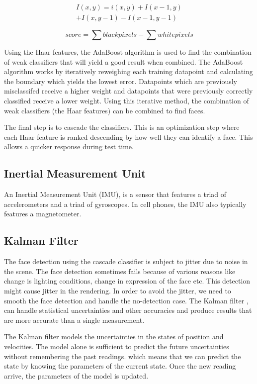 \documentclass[12pt,twocolumn,letterpaper]{article}
\begin{document}
\begin{multline}
\label{eqn:integral}
I(x,y) =  i(x,y) + I(x-1,y) 
\\+ I(x, y-1) - I(x-1, y-1)
\end{multline}


\textbf{\begin{equation}
\label{eqn:haar}
score = \sum{black pixels} - \sum{white pixels}
\end{equation}}

Using the Haar features, the AdaBoost algorithm is used to find the combination of weak classifiers that will yield a good result when combined.  The AdaBoost algorithm works by iteratively reweighing each training datapoint and calculating the boundary which yields the lowest error.  Datapoints which are previously misclassifed receive a higher weight and datapoints that were previously correctly classified receive a lower weight.  Using this iterative method, the combination of weak classifiers (the Haar features) can be combined to find faces.

The final step is to cascade the classifiers.  This is an optimization step where each Haar feature is ranked descending by how well they can identify a face.  This allows a quicker response during test time.
    
\subsection{Inertial Measurement Unit}
An Inertial Measurement Unit (IMU), is a sensor that features a triad of accelerometers and a triad of gyroscopes.  In cell phones, the IMU also typically features a magnetometer. 

\subsection{Kalman Filter}
The face detection using the cascade classifier is subject to jitter due to noise in the scene. The face detection sometimes fails because of various reasons like change is lighting conditions, change in expression of the face etc. This detection might cause jitter in the rendering. In order to avoid the jitter, we need to smooth the face detection and handle the no-detection case. The Kalman filter \cite{kalman}, can handle statistical uncertainties and other accuracies and produce results that are more accurate than a single measurement.

The Kalman filter models the uncertainties  in the states of position and velocities. The model alone is sufficient to predict the future uncertainties without remembering the past readings. which means that we can predict the state by knowing the parameters of the current state. Once the new reading arrive, the parameters of the model is updated.
\end{document}
